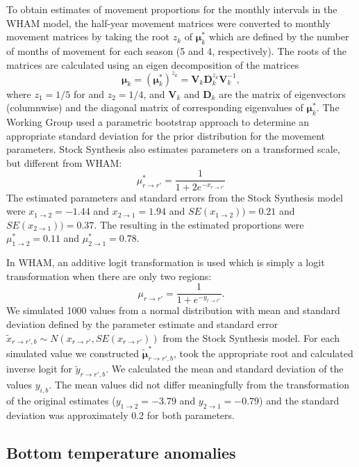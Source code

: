 \documentclass[
]{article}
\begin{document}
To obtain estimates of movement proportions for the monthly intervals in the WHAM model, the half-year movement matrices were converted to monthly movement matrices by taking the root \(z_k\) of \(\boldsymbol{\mu}^*_{k}\) which are defined by the number of months of movement for each season (5 and 4, respectively). The roots of the matrices are calculated using an eigen decomposition of the matrices
\[ \boldsymbol{\mu}_k =  \left(\boldsymbol{\mu}_k^*\right)^{z_k} = \mathbf{V}_k \mathbf{D}_k^{z_k} \mathbf{V}_k^{-1},\]
where \(z_1 = 1/5\) for and \(z_2 = 1/4\), and \(\mathbf{V}_{k}\) and \(\mathbf{D}_{k}\) are the matrix of eigenvectors (columnwise) and the diagonal matrix of corresponding eigenvalues of \(\boldsymbol{\mu}^*_k\). The Working Group used a parametric bootstrap approach to determine an appropriate standard deviation for the prior distribution for the movement parameters. Stock Synthesis also estimates parameters on a transformed scale, but different from WHAM:
\[\mu^*_{r\rightarrow r'} = \frac{1}{1 + 2e^{-x_{r\rightarrow r'}}}\]
The estimated parameters and standard errors from the Stock Synthesis model were \(x_{1\rightarrow 2}=-1.44\) and \(x_{2\rightarrow 1}=1.94\) and \(SE(x_{1\rightarrow 2})) = 0.21\) and \(SE(x_{2\rightarrow 1})) = 0.37\). The resulting in the estimated proportions were \(\mu^*_{1\rightarrow 2}=0.11\) and \(\mu^*_{2\rightarrow 1}=0.78\).

In WHAM, an additive logit transformation is used which is simply a logit transformation when there are only two regions:
\[
\mu_{r\rightarrow r'} = \frac{1}{1+e^{-y_{r\rightarrow r'}}}.
\]
We simulated 1000 values from a normal distribution with mean and standard deviation defined by the parameter estimate and standard error \(\tilde x_{{r\rightarrow r'},b} \sim N(x_{r\rightarrow r'}, SE(x_{r\rightarrow r'}))\) from the Stock Synthesis model. For each simulated value we constructed \(\tilde {\boldsymbol{\mu}}^*_{{r\rightarrow r'},b}\), took the appropriate root and calculated inverse logit for \(\tilde y_{{r\rightarrow r'},b}\). We calculated the mean and standard deviation of the values \(y_{i,b}\). The mean values did not differ meaningfully from the transformation of the original estimates (\(y_{1\rightarrow 2} = -3.79\) and \(y_{2\rightarrow 1} = -0.79\)) and the standard deviation was approximately 0.2 for both parameters.

\hypertarget{bottom-temperature-anomalies}{%
\subsection*{Bottom temperature anomalies}\label{bottom-temperature-anomalies}}
\end{document}
